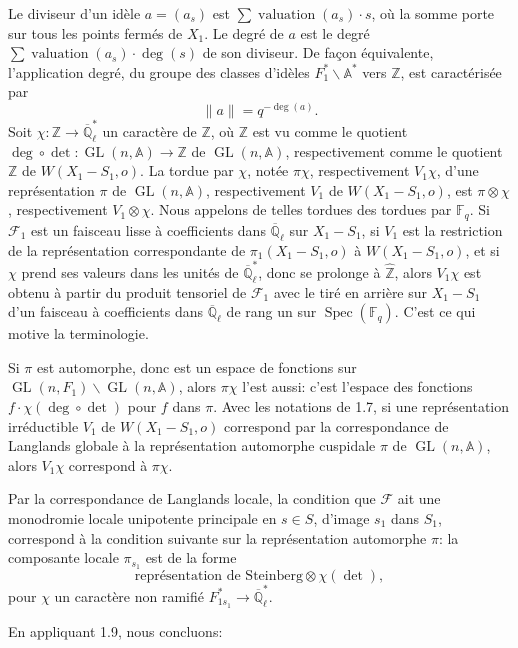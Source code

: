 \documentclass[10pt]{article}
\newcommand{\Fq}{\mathbb F_q}
\newcommand{\Ql}{\overline{\mathbb Q}_{\ell}}
\newcommand{\Adele}{\mathbb A}
\newcommand{\GL}{\operatorname{GL}}
\newcommand{\Zhat}{\widehat{\mathbb Z}}
\newcommand{\val}{\operatorname{valuation}}
\newcommand{\Spec}{\operatorname{Spec}}
\newcommand{\degm}{\operatorname{deg}}
\newcommand{\detm}{\operatorname{det}}
\theoremstyle{deligne}
\newcommand{\heading}[1]{\vspace{0.7em}\noindent{\bfseries #1}\quad}
\begin{document}
\heading{1.10.} Le diviseur d'un id\`ele $a=(a_s)$ est $\sum \val(a_s)\cdot s$, où la somme porte sur tous les points fermés de $X_1$. Le degré de $a$ est le degré $\sum\val(a_s)\cdot\deg(s)$ de son diviseur. De façon équivalente, l'application degré, du groupe des classes d'id\`eles $F_1^*\backslash\Adele^*$ vers $\mathbb Z$, est caractérisée par
\begin{equation}\tag{1.10.1}
 \|a\|=q^{-\degm(a)}.
\end{equation}
Soit $\chi:\mathbb Z\to\Ql^*$ un caractère de $\mathbb Z$, où $\mathbb Z$ est vu comme le quotient $\degm\circ\detm:\GL(n,\Adele)\to\mathbb Z$ de $\GL(n,\Adele)$, respectivement comme le quotient $\mathbb Z$ de $W(X_1-S_1,o)$. La tordue par $\chi$, notée $\pi\chi$, respectivement $V_1\chi$, d'une représentation $\pi$ de $\GL(n,\Adele)$, respectivement $V_1$ de $W(X_1-S_1,o)$, est $\pi\otimes\chi$, respectivement $V_1\otimes\chi$. Nous appelons de telles tordues des tordues par $\Fq$. Si $\mathcal F_1$ est un faisceau lisse à coefficients dans $\Ql$ sur $X_1-S_1$, si $V_1$ est la restriction de la représentation correspondante de $\pi_1(X_1-S_1,o)$ à $W(X_1-S_1,o)$, et si $\chi$ prend ses valeurs dans les unités de $\Ql^*$, donc se prolonge à $\Zhat$, alors $V_1\chi$ est obtenu à partir du produit tensoriel de $\mathcal F_1$ avec le tiré en arrière sur $X_1-S_1$ d'un faisceau à coefficients dans $\Ql$ de rang un sur $\Spec(\Fq)$. C'est ce qui motive la terminologie.

Si $\pi$ est automorphe, donc est un espace de fonctions sur $\GL(n,F_1)\backslash\GL(n,\Adele)$, alors $\pi\chi$ l'est aussi: c'est l'espace des fonctions $f\cdot\chi(\degm\circ\detm)$ pour $f$ dans $\pi$. Avec les notations de 1.7, si une représentation irréductible $V_1$ de $W(X_1-S_1,o)$ correspond par la correspondance de Langlands globale à la représentation automorphe cuspidale $\pi$ de $\GL(n,\Adele)$, alors $V_1\chi$ correspond à $\pi\chi$.

Par la correspondance de Langlands locale, la condition que $\mathcal F$ ait une monodromie locale unipotente principale en $s\in S$, d'image $s_1$ dans $S_1$, correspond à la condition suivante sur la représentation automorphe $\pi$: la composante locale $\pi_{s_1}$ est de la forme
\begin{equation}\tag{1.10.2}
 \text{représentation de Steinberg}\otimes \chi(\detm),
\end{equation}
pour $\chi$ un caractère non ramifié $F_{1s_1}^*\to\Ql^*$.

En appliquant 1.9, nous concluons:
\end{document}
